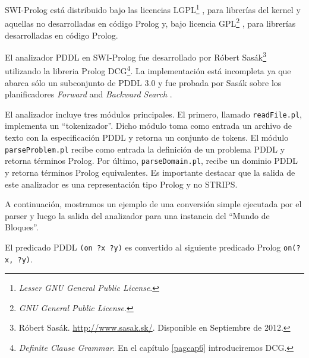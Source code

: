 SWI-Prolog est\'a distribuido bajo las licencias 
LGPL\footnote{\emph{Lesser GNU General Public License}.} \cite{gbraun:lgpl},
para librer\'ias del kernel y aquellas no desarrolladas
en c\'odigo Prolog y, bajo licencia GPL\footnote{\emph{GNU General Public License}.} \cite{gbraun:gpl},
para librer\'ias desarrolladas en c\'odigo Prolog.

El analizador PDDL en SWI-Prolog \cite{gbraun:prolog} fue desarrollado por
R\'obert Sas\'ak\footnote{R\'obert
  Sas\'ak. \url{http://www.sasak.sk/}. Disponible en Septiembre de 2012.} 
utilizando la libreria Prolog DCG\footnote{\emph{Definite Clause Grammar}. 
En el cap\'itulo \ref{pagcap6} introduciremos DCG.}.
La implementaci\'on est\'a incompleta ya que abarca
s\'olo un subconjunto de PDDL 3.0 y fue probada
por Sas\'ak sobre los planificadores \emph{Forward} and 
\emph{Backward Search} \cite{gbraun:Rus09}.

El analizador incluye tres m\'odulos principales. El primero, llamado \texttt{readFile.pl},
implementa un ``tokenizador''. Dicho m\'odulo toma como entrada 
un archivo de texto con la especificaci\'on PDDL y retorna un conjunto
de tokens. El m\'odulo \texttt{parseProblem.pl} recibe como entrada
la definici\'on de un problema PDDL y retorna t\'erminos Prolog.
Por \'ultimo, \texttt{parseDomain.pl}, recibe un dominio PDDL
y retorna t\'erminos Prolog equivalentes. Es importante destacar que la salida
de este analizador es una representaci\'on tipo Prolog y
no STRIPS.

A continuaci\'on, mostramos un ejemplo de una conversi\'on simple
ejecutada por el parser y luego la salida del analizador para
una instancia del  ``Mundo de Bloques''.


\begin{ejemplo}%

El predicado PDDL \texttt{(on ?x ?y)} es convertido
al siguiente predicado Prolog \texttt{on(?x, ?y)}.

\end{ejemplo}


